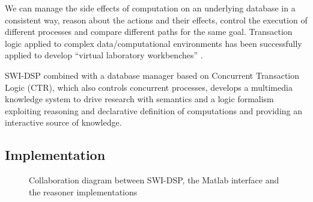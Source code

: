 \documentclass[runningheads]{llncs}
\begin{document}
We can manage the side effects of computation on an underlying database in a consistent way, reason about the actions and their effects, control the execution of different processes and compare different paths for the same goal. Transaction logic applied to complex data/computational environments has been successfully applied to develop ``virtual laboratory workbenches'' \cite{virtual}. 

SWI-DSP combined with a database manager based on Concurrent Transaction Logic (CTR), which also controls concurrent processes, develops a multimedia knowledge system to drive research with semantics and a logic formalism exploiting reasoning and declarative definition of computations and providing an interactive source of knowledge.

\subsection{Implementation}

\begin{figure}
\centerline{}
\caption{Collaboration diagram between SWI-DSP, the Matlab interface and the reasoner implementations}
\label{fig:reasoners}
\end{figure}






\end{document}
